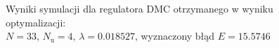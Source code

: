 \begin{figure}[ht]
\centering
{}
\caption{Wyniki symulacji dla regulatora DMC otrzymanego w wyniku optymalizacji:\\ $N=33$, $N_{\mathrm{u}}=4$, $\lambda=\num{0,018527}$, wyznaczony błąd $E=\num{15,5746}$}
\label{Z6optimizedDMC}
\end{figure}
